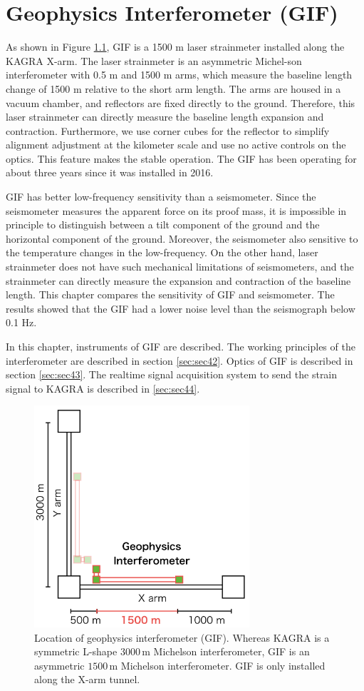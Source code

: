 \chapter{Geophysics Interferometer (GIF)} \label{chap3}
As shown in Figure \ref{img:img402},  GIF is a 1500 m laser strainmeter installed along the KAGRA X-arm. The laser strainmeter is an asymmetric Michel-son interferometer with 0.5 m and 1500 m arms, which measure the baseline length change of 1500 m relative to the short arm length. The arms are housed in a vacuum chamber, and reflectors are fixed directly to the ground. Therefore, this laser strainmeter can directly measure the baseline length expansion and contraction. Furthermore, we use corner cubes for the reflector to simplify alignment adjustment at the kilometer scale and use no active controls on the optics. This feature makes the stable operation. The GIF has been operating for about three years since it was installed in 2016.

GIF has better low-frequency sensitivity than a seismometer.  Since the seismometer measures the apparent force on its proof mass, it is impossible in principle to distinguish between a tilt component of the ground and the horizontal component of the ground. Moreover, the seismometer also sensitive to the temperature changes in the low-frequency. On the other hand, laser strainmeter does not have such mechanical limitations of seismometers, and the strainmeter can directly measure the expansion and contraction of the baseline length. This chapter compares the sensitivity of GIF and seismometer. The results showed that the GIF had a lower noise level than the seismograph below 0.1 Hz.

In this chapter, instruments of GIF are described. The working principles of the interferometer are described in section \cref{sec:sec42}. Optics of GIF is described in section \cref{sec:sec43}. The realtime signal acquisition system to send the strain signal to KAGRA is described in \cref{sec:sec44}.

\begin{figure}[h]
  \centering
  \includegraphics[width=8cm]{./img_chap4/img402.png}
  \caption{Location of geophysics interferometer (GIF). Whereas KAGRA is a symmetric L-shape $3000\,\mathrm{m}$ Michelson interferometer, GIF is an asymmetric $1500\,\mathrm{m}$ Michelson interferometer. GIF is only installed along the X-arm tunnel.} \label{img:img402}
\end{figure}

